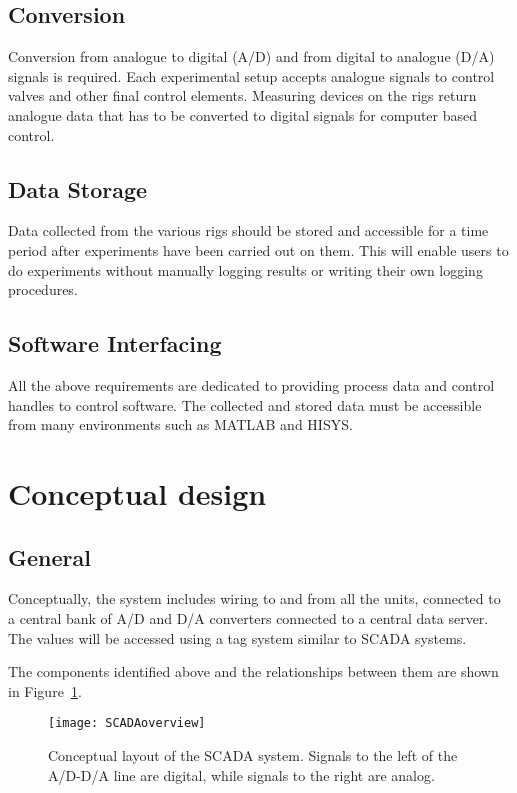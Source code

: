 \subsection{Conversion}
Conversion from analogue to digital (A/D) and from digital to analogue (D/A) signals is required.  Each experimental setup accepts analogue signals to control valves and other final control elements.  Measuring devices on the rigs return analogue data that has to be converted to digital signals for computer based control.

\subsection{Data Storage}
Data collected from the various rigs should be stored and accessible for a time period after experiments have been carried out on them.  This will enable users to do experiments without manually logging results or writing their own logging procedures.

\subsection{Software Interfacing}
All the above requirements are dedicated to providing process data and control handles to control software.  The collected and stored data must be accessible from many environments such as MATLAB and HISYS.  

\section{Conceptual design}
\subsection{General}

Conceptually, the system includes wiring to and from all the units, connected to a central bank of A/D and D/A converters connected to a central data server.  The values will be accessed using a tag system similar to SCADA systems.

The components identified above and the relationships between them are shown in Figure~\ref{fig:SCADAoverview}.

\begin{figure}
	\centering
	\texttt{[image: SCADAoverview]}
	\caption[Conceptual SCADA layout]{Conceptual layout of the SCADA system.  Signals to the left of the A/D-D/A line are digital, while signals to the right are analog.}
	\label{fig:SCADAoverview}
\end{figure}

